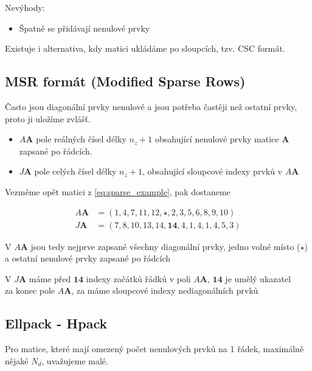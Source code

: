 \documentclass[../main.tex]{subfiles}
\begin{document}
Nevýhody: \begin{itemize}
    \item Špatně se přidávají nenulové prvky
\end{itemize}

Existuje i alternativa, kdy matici ukládáme po sloupcích, tzv. CSC formát.


\subsection{MSR formát (Modified Sparse Rows)}

Často jsou diagonální prvky \matA nenulové a jsou potřeba častěji než ostatní prvky, proto ji uložíme zvlášť.




\begin{itemize}
    \item $A\mathbf{A}$ pole reálných čísel délky $n_z +1$ obsahující nenulové prvky matice $\mathbf{A}$ zapsané po řádcích.
    \item $J\mathbf{A}$ pole celých čísel délky $n_z +1$, obsahující sloupcové indexy prvků v $A\mathbf{A}$
    
\end{itemize}

\begin{example}
    Vezměme opět matici z \eqref{eq:sparse_example}, pak dostaneme
    
    \begin{align*}
        A\mathbf{A} &= (1,4,7,11,12,\star,2,3,5,6,8,9,10)\\
        J\mathbf{A} &= (7,8,10,13,14,\mathbf{14},4,1,4,1,4,5,3)
    \end{align*}

    V $A\mathbf{A}$ jsou tedy nejprve zapsané všechny diagonální prvky, jedno volné místo ($\star$) \\
    a ostatní nenulové prvky zapsané po řádcích

    V $J\mathbf{A}$ máme před $\mathbf{14}$ indexy začátků řádků v poli $A\mathbf{A}$, $\mathbf{14}$ je umělý ukazatel\\
    za konec pole $A\mathbf{A}$, za máme sloupcové indexy nediagonálních prvků
\end{example}



\subsection{Ellpack - Hpack}
Pro matice, které mají omezený počet nenulových prvků na 1 řádek, maximálně nějaké $N_d$, uvažujeme malé.
\end{document}
